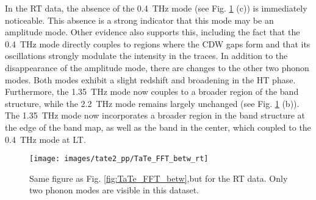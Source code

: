
In the RT data, the absence of the \qty{0.4}{\tera\hertz} mode (see Fig. \ref{fig:TaTe_FFT_betw_rt} (c)) is immediately noticeable.
This absence is a strong indicator that this mode may be an amplitude mode.
Other evidence also supports this, including the fact that the \qty{0.4}{\tera\hertz} mode directly couples to regions where the CDW gaps form and that its oscillations strongly modulate the intensity in the traces.
In addition to the disappearance of the amplitude mode, there are changes to the other two phonon modes.
Both modes exhibit a slight redshift and broadening in the HT phase.
Furthermore, the \qty{1.35}{\tera\hertz} mode now couples to a broader region of the band structure, while the \qty{2.2}{\tera\hertz} mode remains largely unchanged (see Fig. \ref{fig:TaTe_FFT_betw_rt} (b)).
The \qty{1.35}{\tera\hertz} mode now incorporates a broader region in the band structure at the edge of the band map, as well as the band in the center, which coupled to the \qty{0.4}{\tera\hertz} mode at LT.

\begin{figure}[t]
	\centering
	\texttt{[image: images/tate2\_pp/TaTe\_FFT\_betw\_rt]}
	\caption{Same figure as Fig. \ref{fig:TaTe_FFT_betw},but for the RT data. Only two phonon modes are visible in this dataset.}
	\label{fig:TaTe_FFT_betw_rt}
\end{figure}

